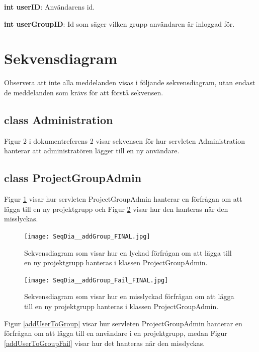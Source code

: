 \documentclass[a4paper]{article}
\begin{document}
\vspace{5mm}
\begin{hangparas}{1.5em}{1}
\textbf{int userID}: Användarens id. 
\end{hangparas}

\vspace{5mm}
\begin{hangparas}{1.5em}{1}
\textbf{int userGroupID}: Id som säger vilken grupp användaren är inloggad för. 
\end{hangparas}

\section{Sekvensdiagram}

Observera att inte alla meddelanden visas i följande sekvensdiagram, utan endast de meddelanden som krävs för att förstå sekvensen.

\subsection{class Administration}
Figur 2 i dokumentreferens 2 visar sekvensen för hur servleten Administration hanterar att administratören lägger till en ny användare.


\subsection{class ProjectGroupAdmin}
Figur \ref{addGroup} visar hur servleten ProjectGroupAdmin hanterar en förfrågan om att lägga till en ny projektgrupp och Figur \ref{addGroupFail} visar hur den hanteras när den misslyckas. 

\begin{figure}[h!]
\centering
\texttt{[image: SeqDia\_\_addGroup\_FINAL.jpg]}
\caption{Sekvensdiagram som visar hur en lyckad förfrågan om att lägga till en ny projektgrupp hanteras i klassen ProjectGroupAdmin. \label{addGroup}}
\end{figure}

\begin{figure}[h!]
\centering
\texttt{[image: SeqDia\_\_addGroup\_Fail\_FINAL.jpg]}
\caption{Sekvensdiagram som visar hur en misslyckad förfrågan om att lägga till en ny projektgrupp hanteras i klassen ProjectGroupAdmin. \label{addGroupFail}}
\end{figure}

\noindent
Figur \ref{addUserToGroup} visar hur servleten ProjectGroupAdmin hanterar en förfrågan om att lägga till en användare i en projektgrupp, medan Figur \ref{addUserToGroupFail} visar hur det hanteras när den misslyckas.
\end{document}
